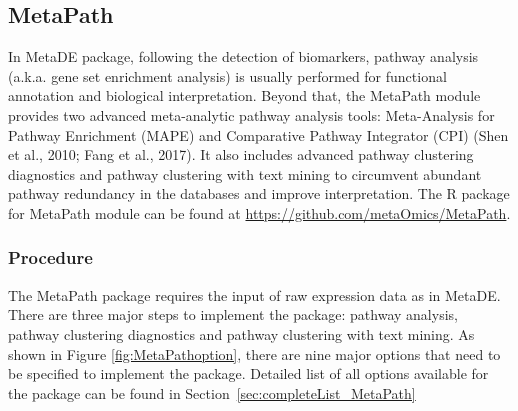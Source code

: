 \subsection{MetaPath}

In MetaDE package,
following the detection of biomarkers, pathway analysis (a.k.a. gene set enrichment analysis) is usually performed for functional annotation and biological interpretation. 
Beyond that, the MetaPath module provides two advanced meta-analytic pathway analysis tools: 
Meta-Analysis for Pathway Enrichment (MAPE) and Comparative Pathway Integrator (CPI) (Shen et al., 2010; Fang et al., 2017). 
It also includes advanced pathway clustering diagnostics and pathway clustering with text mining to circumvent abundant pathway redundancy in the databases and improve interpretation. 
The R package for MetaPath module can be found at \url{https://github.com/metaOmics/MetaPath}.

\subsubsection{Procedure}
The MetaPath package requires the input of raw expression data as in MetaDE. 
There are three major steps to implement the package: pathway analysis, pathway clustering diagnostics and pathway clustering with text mining. 
As shown in Figure \ref{fig:MetaPathoption}, there are nine major options that need to be specified to implement the package.
Detailed list of all options available for the package can be found in Section~\ref{sec:completeList_MetaPath} 


